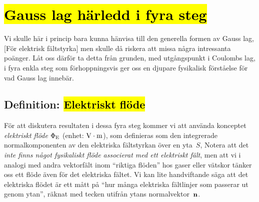 \section{\hl{Gauss lag h{\"a}rledd i fyra steg}}
Vi skulle h{\"a}r i princip bara kunna h{\"a}nvisa till den generella formen
av Gauss
lag, [F{\"o}r elektrisk f{\"a}ltstyrka] men skulle d{\aa}
riskera att missa n{\aa}gra intressanta po{\"a}nger.
L{\aa}t oss d{\"a}rf{\"o}r ta detta fr{\aa}n grunden, med ut\-g{\aa}ngs\-punkt
i Coulombs lag, i fyra enkla steg som f{\"o}rhoppningsvis ger oss en djupare
fysikalisk f{\"o}rst{\aa}else f{\"o}r vad Gauss lag inneb{\"a}r.

\subsection{Definition: \hl{Elektriskt fl{\"o}de}}
F{\"o}r att diskutera resultaten i dessa fyra steg kommer vi att anv{\"a}nda
konceptet {\it elektriskt fl{\"o}de} $\Phi_{\rm E}$
(enhet: ${\rm V}\cdot{\rm m}$), som definieras som den integrerade
normalkomponenten av den elektriska f{\"a}ltstyrkan {\"o}ver en yta~$S$,
\noindent
Notera att det {\it inte finns n{\aa}got fysikaliskt fl{\"o}de associerat med
ett elektriskt f{\"a}lt}, men att vi i analogi med andra vektorf{\"a}lt inom
``riktiga fl{\"o}den'' hos gaser eller v{\"a}tskor t{\"a}nker oss ett fl{\"o}de
{\"a}ven f{\"o}r det elektriska f{\"a}ltet.
Vi kan lite handviftande s{\"a}ga att det elektriska fl{\"o}det {\"a}r ett
m{\aa}tt p{\aa} ``hur m{\aa}nga elektriska f{\"a}ltlinjer som passerar ut
genom ytan'', r{\"a}knat med tecken utifr{\aa}n ytans
normalvektor~${\bf n}$.
\vfill\eject

